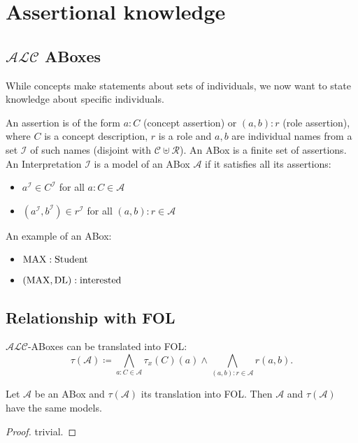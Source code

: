 \newpage
\section{Assertional knowledge}
\subsection{$\mathcal{ALC}$ ABoxes}
While concepts make statements about sets of individuals, we now want to state knowledge about specific individuals.

\begin{definition}
	An assertion is of the form $a:C$ (concept assertion) or $(a,b):r$ (role assertion),
	where $C$ is a concept description, $r$ is a role and $a,b$ are individual names from a set $\mathscr{I}$ of such names (disjoint with $\mathscr{C} \uplus \mathscr{R}$).
	An ABox is a finite set of assertions.
	An Interpretation $\mathcal{I}$ is a model of an ABox $\mathcal{A}$ if it satisfies all its assertions:
	\begin{itemize}
		\item $a^{\mathcal{I}} \in C^{\mathcal{I}}$ for all $a:C \in \mathcal{A}$ 
		\item $(a^{\mathcal{I}}, b^{\mathcal{I}}) \in r^{\mathcal{I}}$ for all $(a,b):r \in \mathcal{A}$
	\end{itemize}
\end{definition}

\begin{example}
	An example of an ABox:
	\begin{itemize}
		\item $ \mathit{\text{MAX}}: \mathit{\text{Student}}$
		\item $(\mathit{\text{MAX}}, \mathit{\text{DL}}): \mathit{\text{interested}}$
	\end{itemize}
\end{example}

\subsection{Relationship with FOL}
$\mathcal{ALC}$-ABoxes can be translated into FOL:
\[
	\tau(\mathcal{A}) \coloneqq \bigwedge_{a:C \in \mathcal{A}} \tau_{x}(C)(a) \land \bigwedge_{(a,b):r \in \mathcal{A}} r(a,b)
.\]

\begin{lemma}
	Let $\mathcal{A}$ be an ABox and $\tau(\mathcal{A})$ its translation into FOL.
	Then $\mathcal{A}$ and $\tau (\mathcal{A})$ have the same models.
\end{lemma}
\begin{proof}
	trivial.
\end{proof}

